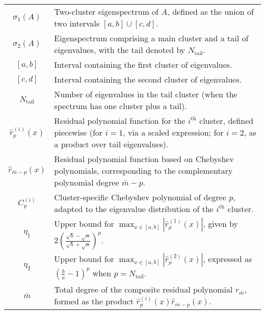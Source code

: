 \begin{longtable}{c p{10cm}}
    $\sigma_1(A)$            & Two-cluster eigenspectrum of $A$, defined as the union of two intervals $[a,b] \cup [c,d]$.                                                                        \\
    $\sigma_2(A)$            & Eigenspectrum comprising a main cluster and a tail of eigenvalues, with the tail denoted by $N_{\text{tail}}$.                                                     \\
    $[a,b]$                  & Interval containing the first cluster of eigenvalues.                                                                                                              \\
    $[c,d]$                  & Interval containing the second cluster of eigenvalues.                                                                                                             \\
    $N_{\text{tail}}$        & Number of eigenvalues in the tail cluster (when the spectrum has one cluster plus a tail).                                                                         \\
    $\hat{r}^{(i)}_p(x)$     & Residual polynomial function for the $i^\text{th}$ cluster, defined piecewise (for $i=1$, via a scaled expression; for $i=2$, as a product over tail eigenvalues). \\
    $\hat{r}_{\bar{m}-p}(x)$ & Residual polynomial function based on Chebyshev polynomials, corresponding to the complementary polynomial degree $\bar{m}-p$.                                     \\
    $C^{(i)}_{p}$            & Cluster-specific Chebyshev polynomial of degree $p$, adapted to the eigenvalue distribution of the $i^\text{th}$ cluster.                                          \\
    $\eta_1$                 & Upper bound for $\max_{x \in [a,b]} |\hat{r}^{(1)}_p(x)|$, given by $2\left(\frac{\sqrt{b}-\sqrt{a}}{\sqrt{b}+\sqrt{a}}\right)^p$.                                 \\
    $\eta_2$                 & Upper bound for $\max_{x \in [a,b]} |\hat{r}^{(2)}_p(x)|$, expressed as $\left(\frac{b}{a}-1\right)^p$ when $p=N_{\text{tail}}$.                                   \\
    $\bar{m}$                & Total degree of the composite residual polynomial $r_{\bar{m}}$, formed as the product $\hat{r}^{(i)}_p(x)\hat{r}_{\bar{m}-p}(x)$.                                 \\

\end{longtable}
